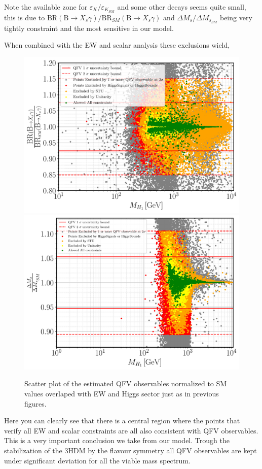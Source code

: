Note the available zone for $\varepsilon_K/\varepsilon_{K_{SM}}$ and some other decays seems quite small, this is due to ${\textrm{BR} ( \textrm{B} \rightarrow X_s \gamma)}/{\textrm{BR}_{SM} ( \textrm{B} \rightarrow X_s \gamma )}$ and ${\Delta M_s}/{\Delta M_{s_{SM}} }$ being very tightly constraint and the most sensitive in our model.

When combined with the EW and scalar analysis these exclusions wield, 

\begin{figure}[H]
	\centering
	\includegraphics[width=.49\textwidth]{Images/3HDM/PT_Folder/XsGamma_H1.pdf}
    \includegraphics[width=.49\textwidth]{Images/3HDM/PT_Folder/Delta_Ms_H1.pdf}
    \caption{ Scatter plot of the estimated QFV observables normalized to SM values overlaped with EW and Higgs sector just as in previous figures. } 
	\label{fig:3HDM_Flavour_PT}
\end{figure}	

Here you can clearly see that there is a central region where the points that verify all EW and scalar constraints are all also consistent with QFV observables. 
%
This is a very important conclusion we take from our model. Trough the stabilization of the 3HDM by the flavour symmetry all QFV observables are kept under significant deviation for all the viable mass spectrum.  

